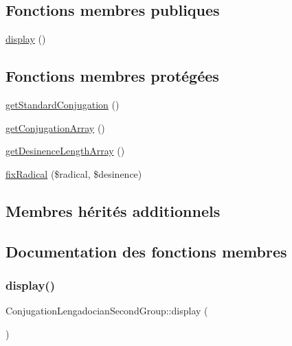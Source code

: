 \subsection*{Fonctions membres publiques}
\begin{DoxyCompactItemize}
\item 
\hyperlink{class_conjugation_lengadocian_second_group_a9d00d6ae2616d21e1cf495ec94c06aa9}{display} ()
\end{DoxyCompactItemize}
\subsection*{Fonctions membres protégées}
\begin{DoxyCompactItemize}
\item 
\hyperlink{class_conjugation_lengadocian_second_group_a710cb66b717733d6d5198e23a261bdab}{get\+Standard\+Conjugation} ()
\item 
\hyperlink{class_conjugation_lengadocian_second_group_a06cea5291eea31ff2aa699f5c27cbf5f}{get\+Conjugation\+Array} ()
\item 
\hyperlink{class_conjugation_lengadocian_second_group_a8230cbb2d79d7ce6d85b866082925b12}{get\+Desinence\+Length\+Array} ()
\item 
\hyperlink{class_conjugation_lengadocian_second_group_a236aaf5140e4cb5738a2af876eded810}{fix\+Radical} (\$radical, \$desinence)
\end{DoxyCompactItemize}
\subsection*{Membres hérités additionnels}


\subsection{Documentation des fonctions membres}
\hypertarget{class_conjugation_lengadocian_second_group_a9d00d6ae2616d21e1cf495ec94c06aa9}{}\label{class_conjugation_lengadocian_second_group_a9d00d6ae2616d21e1cf495ec94c06aa9} 
\subsubsection{\texorpdfstring{display()}{display()}}
{\footnotesize\ttfamily Conjugation\+Lengadocian\+Second\+Group\+::display (\begin{DoxyParamCaption}{ }\end{DoxyParamCaption})}



